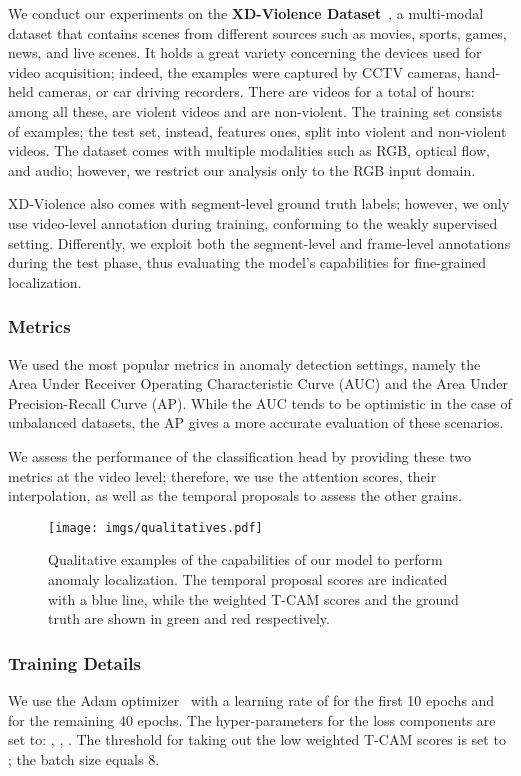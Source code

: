 \documentclass[runningheads]{llncs}
\begin{document}
We conduct our experiments on the \textbf{XD-Violence Dataset}~\cite{wu2020not}, a multi-modal dataset that contains scenes from different sources such as movies, sports, games, news, and live scenes. It holds a great variety concerning the devices used for video acquisition; indeed, the examples were captured by CCTV cameras, hand-held cameras, or car driving recorders. There are  videos for a total of  hours: among all these,  are violent videos and  are non-violent. The training set consists of  examples; the test set, instead, features  ones, split into  violent and  non-violent videos. The dataset comes with multiple modalities such as RGB, optical flow, and audio; however, we restrict our analysis only to the RGB input domain.

XD-Violence also comes with segment-level ground truth labels; however, we only use video-level annotation during training, conforming to the weakly supervised setting. Differently, we exploit both the segment-level and frame-level annotations during the test phase, thus evaluating the model's capabilities for fine-grained localization.
\subsubsection{Metrics}
We used the most popular metrics in anomaly detection settings, namely the Area Under Receiver Operating Characteristic Curve (AUC) and the Area Under Precision-Recall Curve (AP). While the AUC tends to be optimistic in the case of unbalanced datasets, the AP gives a more accurate evaluation of these scenarios.

We assess the performance of the classification head by providing these two metrics at the video level; therefore, we use the attention scores, their interpolation, as well as the temporal proposals to assess the other grains.
\begin{figure}[t]
    \centering
    \texttt{[image: imgs/qualitatives.pdf]}
    \caption{Qualitative examples of the capabilities of our model to perform anomaly localization. The temporal proposal scores are indicated with a blue line, while the weighted T-CAM scores and the ground truth are shown in green and red respectively.}
    \label{fig:align}
\end{figure}
\subsubsection{Training Details}
We use the Adam optimizer~\cite{kingma2014adam} with a learning rate of  for the first 10 epochs and  for the remaining 40 epochs. The hyper-parameters for the loss components are set to: , , . The threshold for taking out the low weighted T-CAM scores is set to ; the batch size equals 8.
\end{document}
